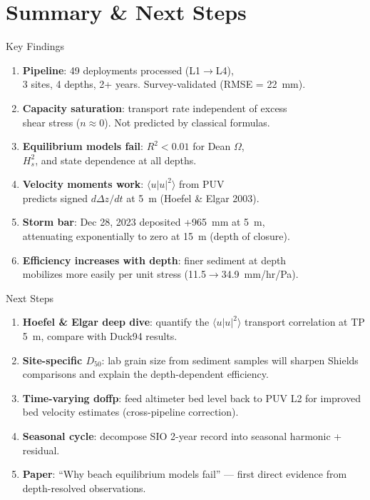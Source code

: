 \documentclass[10pt, aspectratio=169]{beamer}
\begin{document}
\section{Summary \& Next Steps}

\begin{frame}{Key Findings}
  \begin{enumerate}
    \item \textbf{Pipeline}: 49 deployments processed (L1$\rightarrow$L4),\\
          3 sites, 4 depths, 2+ years. Survey-validated (RMSE = 22~mm).
    \item \textbf{Capacity saturation}: transport rate independent of excess\\
          shear stress ($n \approx 0$). Not predicted by classical formulas.
    \item \textbf{Equilibrium models fail}: $R^2 < 0.01$ for Dean $\Omega$,\\
          $H_s^2$, and state dependence at all depths.
    \item \textbf{Velocity moments work}: $\langle u|u|^2 \rangle$ from PUV\\
          predicts signed $d\Delta z/dt$ at 5~m (Hoefel \& Elgar 2003).
    \item \textbf{Storm bar}: Dec 28, 2023 deposited +965~mm at 5~m,\\
          attenuating exponentially to zero at 15~m (depth of closure).
    \item \textbf{Efficiency increases with depth}: finer sediment at depth\\
          mobilizes more easily per unit stress (11.5$\rightarrow$34.9~mm/hr/Pa).
  \end{enumerate}
\end{frame}

\begin{frame}{Next Steps}
  \begin{enumerate}
    \item \textbf{Hoefel \& Elgar deep dive}: quantify the
          $\langle u|u|^2 \rangle$ transport correlation at TP 5~m,
          compare with Duck94 results.
    \item \textbf{Site-specific $D_{50}$}: lab grain size from sediment
          samples will sharpen Shields comparisons and explain the
          depth-dependent efficiency.
    \item \textbf{Time-varying doffp}: feed altimeter bed level back to
          PUV L2 for improved bed velocity estimates (cross-pipeline
          correction).
    \item \textbf{Seasonal cycle}: decompose SIO 2-year record into
          seasonal harmonic + residual.
    \item \textbf{Paper}: ``Why beach equilibrium models fail'' ---
          first direct evidence from depth-resolved observations.
  \end{enumerate}
\end{frame}
\end{document}
